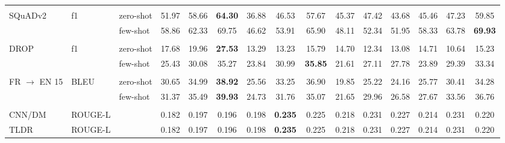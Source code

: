 \begin{tabular}{lll<{\hspace{0.8 ex}}>{\hspace{0.8 ex}}ccc<{\hspace{0.8 ex}}>{\hspace{0.8 ex}}ccc<{\hspace{0.8 ex}}>{\hspace{0.8 ex}}ccc<{\hspace{0.8 ex}}>{\hspace{0.8 ex}}ccc<{\hspace{0.8 ex}}}
                           &             &               &       &       &       &        &        &       &        &       &       &        &        &       \\
    SQuADv2                & f1          & zero-shot     & 51.97 & 58.66 & \textbf{64.30} &  36.88 &  46.53 & 57.67 &  45.37 & 47.42 & 43.68 &  45.46 &  47.23 & 59.85 \\
                           &             & few-shot      & 58.86 & 62.33 & 69.75 &  46.62 &  53.91 & 65.90 &  48.11 & 52.34 & 51.95 &  58.33 &  63.78 & \textbf{69.93}  \\
                           &             &               &       &       &       &        &        &       &        &       &       &        &        &       \\
    DROP                   & f1          & zero-shot     & 17.68 & 19.96 & \textbf{27.53} &  13.29 &  13.23 & 15.79 &  14.70 & 12.34 & 13.08 &  14.71 &  10.64 & 15.23 \\
                           &             & few-shot      & 25.43 & 30.08 & 35.27 &  23.84 &  30.99 & \textbf{35.85} &  21.61 & 27.11 & 27.78 &  23.89 &  29.39 & 33.34 \\
                           &             &               &       &       &       &        &        &       &        &       &       &        &        &       \\
    FR $\rightarrow$ EN 15 & BLEU        & zero-shot     & 30.65 & 34.99 & \textbf{38.92} &  25.56 &  33.25 & 36.90 &  19.85 & 25.22 & 24.16 &  25.77 &  30.41 & 34.28 \\
                           &             & few-shot      & 31.37 & 35.49 & \textbf{39.93} &  24.73 &  31.76 & 35.07 &  21.65 & 29.96 & 26.58 &  27.67 &  33.56 & 36.76 \\
                           &             &               &       &       &       &        &        &       &        &       &       &        &        &       \\
    CNN/DM                 & ROUGE-L     &               & 0.182 & 0.197 & 0.196 &  0.198 & \textbf{0.235} & 0.225 &  0.218 & 0.231 & 0.227 &  0.214 &  0.231 & 0.220 \\
    TLDR                   & ROUGE-L     &               & 0.182 & 0.197 & 0.196 &  0.198 & \textbf{0.235} & 0.225 &  0.218 & 0.231 & 0.227 &  0.214 &  0.231 & 0.220 \\
    \bottomrule
\end{tabular}

\setlength{\savedtabcolsep}{\tabcolsep}


